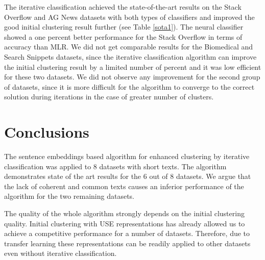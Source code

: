 \documentclass[11pt,a4paper]{article}
\begin{document}
The iterative classification achieved the state-of-the-art results on the Stack Overflow and AG News datasets with both types of classifiers and improved the good initial clustering result further (see Table \ref{sota1}). The neural classifier showed a one percent better performance for the Stack Overflow in terms of accuracy than MLR. We did not get comparable results for the Biomedical and Search Snippets datasets, since the iterative classification algorithm can improve the initial clustering result by a limited number of percent and it was low efficient for these two datasets. We did not observe any improvement for the second group of datasets, since it is more difficult for the algorithm to converge to the correct solution during iterations in the case of greater number of clusters.

\section{Conclusions}

The sentence embeddings based algorithm for enhanced clustering by iterative classification was applied to 8 datasets with short texts. The algorithm demonstrates state of the art results for the 6 out of 8 datasets. We argue that the lack of coherent and common texts causes an inferior performance of the algorithm for the two remaining datasets.

The quality of the whole algorithm strongly depends on the initial clustering quality. Initial clustering with USE representations has already allowed us to achieve a competitive performance for a number of datasets. Therefore, due to transfer learning these representations can be readily applied to other datasets even without iterative classification.
\end{document}
